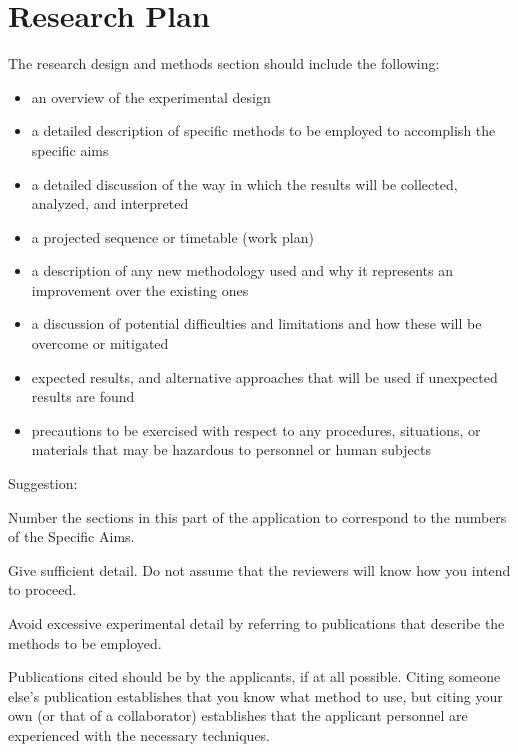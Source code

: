 \documentclass[10pt]{report}
\begin{document}
\section{Research Plan}
\label{sec:researchplan}

The research design and methods section should include the following:

\begin{itemize}
    \item an overview of the experimental design

    \item a detailed description of specific methods to be employed to accomplish the specific aims

    \item a detailed discussion of the way in which the results will be collected, analyzed, and interpreted

    \item a projected sequence or timetable (work plan)

    \item a description of any new methodology used and why it represents an improvement over the existing ones

    \item a discussion of potential difficulties and limitations and how these will be overcome or mitigated

    \item expected results, and alternative approaches that will be used if unexpected results are found

    \item precautions to be exercised with respect to any procedures, situations, or materials that may be hazardous to personnel or human subjects
\end{itemize}


Suggestion:

    Number the sections in this part of the application to correspond to the numbers of the Specific Aims.

    Give sufficient detail. Do not assume that the reviewers will know how you intend to proceed.

    Avoid excessive experimental detail by referring to publications that describe the methods to be employed.

    Publications cited should be by the applicants, if at all possible. Citing someone else's publication establishes that you know what method to use, but citing your own (or that of a collaborator) establishes that the applicant personnel are experienced with the necessary techniques.
\end{document}
